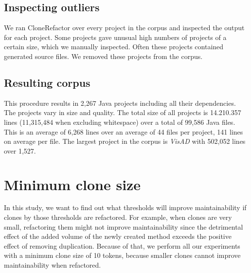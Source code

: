 \subsection{Inspecting outliers}
We ran CloneRefactor over every project in the corpus and inspected the output for each project. Some projects gave unusual high numbers of projects %
of a certain size, which we manually inspected. Often these projects contained generated source files. We removed these projects from the corpus.

\subsection{Resulting corpus}
This procedure results in 2,267 Java projects including all their dependencies. The projects vary in size and quality. The total size of all projects is 14.210.357 lines (11,315,484 when excluding whitespace) over a total of 99,586 Java files. This is an average of 6,268 lines over an average of 44 files per project, 141 lines on average per file. The largest project in the corpus is \textit{VisAD} with 502,052 lines over 1,527. %

\section{Minimum clone size}
In this study, we want to find out what thresholds will improve maintainability if clones by those thresholds are refactored. For example, when clones are very small, refactoring them might not improve maintainability since the detrimental effect of the added volume of the newly created method exceeds the positive effect of removing duplication. Because of that, we perform all our experiments with a minimum clone size of 10 tokens, because smaller clones cannot improve maintainability when refactored. %


